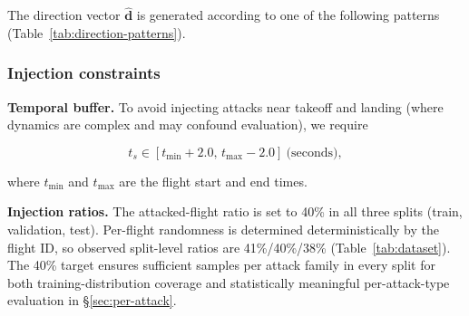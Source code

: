 \documentclass{ieeeaccess}
\begin{document}
The direction vector $\hat{\mathbf{d}}$ is generated according to one of the following patterns (Table~\ref{tab:direction-patterns}).

\begin{table}[!t]
\caption{Direction patterns for generating $\hat{\mathbf{d}}$.}
\label{tab:direction-patterns}
\centering
{}
\end{table}

\subsubsection{Injection constraints}

\textbf{Temporal buffer.} To avoid injecting attacks near takeoff and landing (where dynamics are complex and may confound evaluation), we require

\begin{equation}
t_s\in[t_{\min}+2.0,\,t_{\max}-2.0]\ \text{(seconds)},
\end{equation}

where $t_{\min}$ and $t_{\max}$ are the flight start and end times.

\textbf{Injection ratios.} The attacked-flight ratio is set to 40\% in all three splits (train, validation, test). Per-flight randomness is determined deterministically by the flight ID, so observed split-level ratios are 41\%/40\%/38\% (Table~\ref{tab:dataset}). The 40\% target ensures sufficient samples per attack family in every split for both training-distribution coverage and statistically meaningful per-attack-type evaluation in \S\ref{sec:per-attack}.
\end{document}
